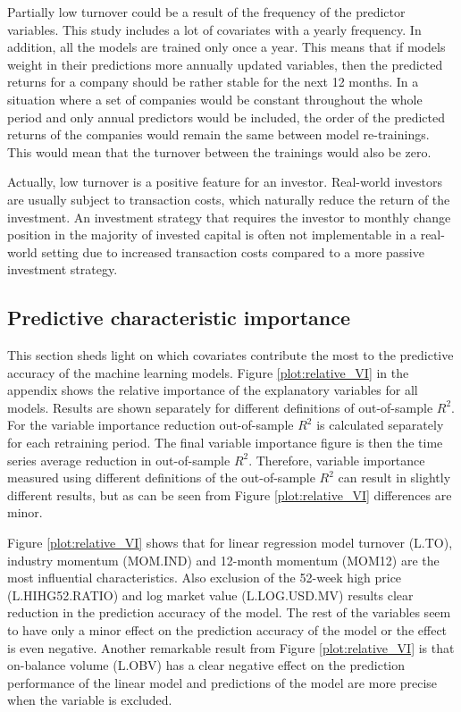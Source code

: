 \documentclass[12pt]{article}
\begin{document}
Partially low turnover could be a result of the frequency of the predictor variables. This study includes a lot of covariates with a yearly frequency. In addition, all the models are trained only once a year. This means that if models weight in their predictions more annually updated variables, then the predicted returns for a company should be rather stable for the next 12 months. In a situation where a set of companies would be constant throughout the whole period and only annual predictors would be included, the order of the predicted returns of the companies would remain the same between model re-trainings. This would mean that the turnover between the trainings would also be zero. \par

Actually, low turnover is a positive feature for an investor. Real-world investors are usually subject to transaction costs, which naturally reduce the return of the investment. An investment strategy that requires the investor to monthly change position in the majority of invested capital is often not implementable in a real-world setting due to increased transaction costs compared to a more passive investment strategy. \par

\subsection{Predictive characteristic importance}\label{PredictiveCharacteristicImportance}

This section sheds light on which covariates contribute the most to the predictive accuracy of the machine learning models. Figure \ref{plot:relative_VI} in the appendix shows the relative importance of the explanatory variables for all models. Results are shown separately for different definitions of out-of-sample $R^2$. For the variable importance reduction out-of-sample $R^2$ is calculated separately for each retraining period. The final variable importance figure is then the time series average reduction in out-of-sample $R^2$. Therefore, variable importance measured using different definitions of the out-of-sample $R^2$ can result in slightly different results, but as can be seen from Figure \ref{plot:relative_VI} differences are minor. \par

Figure \ref{plot:relative_VI} shows that for linear regression model turnover (L.TO), industry momentum (MOM.IND) and 12-month momentum (MOM12) are the most influential characteristics. Also exclusion of the 52-week high price (L.HIHG52.RATIO) and log market value (L.LOG.USD.MV) results clear reduction in the prediction accuracy of the model. The rest of the variables seem to have only a minor effect on the prediction accuracy of the model or the effect is even negative. Another remarkable result from Figure \ref{plot:relative_VI} is that on-balance volume (L.OBV) has a clear negative effect on the prediction performance of the linear model and predictions of the model are more precise when the variable is excluded. \par
\end{document}
